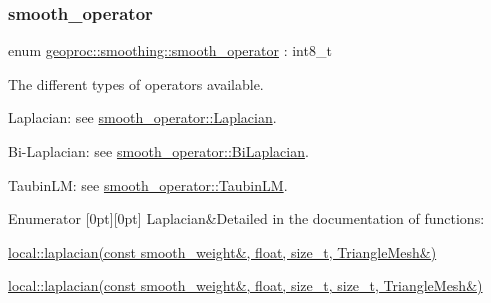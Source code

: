 \subsubsection{\texorpdfstring{smooth\+\_\+operator}{smooth\_operator}}
{\footnotesize\ttfamily enum \hyperlink{namespacegeoproc_1_1smoothing_a64c2bfd1dda6cfbf39afa2e61fd62537}{geoproc\+::smoothing\+::smooth\+\_\+operator} \+: int8\+\_\+t\hspace{0.3cm}{\ttfamily [strong]}}



The different types of operators available. 


\begin{DoxyItemize}
\item Laplacian\+: see \hyperlink{namespacegeoproc_1_1smoothing_a64c2bfd1dda6cfbf39afa2e61fd62537a799723f39baf497704a3d39e7c03555f}{smooth\+\_\+operator\+::\+Laplacian}.
\item Bi-\/\+Laplacian\+: see \hyperlink{namespacegeoproc_1_1smoothing_a64c2bfd1dda6cfbf39afa2e61fd62537a0890724bffb79f511bc768c0529dce3f}{smooth\+\_\+operator\+::\+Bi\+Laplacian}.
\item Taubin\+LM\+: see \hyperlink{namespacegeoproc_1_1smoothing_a64c2bfd1dda6cfbf39afa2e61fd62537ad69ec4945f39affa518f05fa077b00ae}{smooth\+\_\+operator\+::\+Taubin\+LM}. 
\end{DoxyItemize}\begin{DoxyEnumFields}{Enumerator}
[0pt][0pt]{}\mbox{\label{namespacegeoproc_1_1smoothing_a64c2bfd1dda6cfbf39afa2e61fd62537a799723f39baf497704a3d39e7c03555f}} 
Laplacian&Detailed in the documentation of functions\+:
\begin{DoxyItemize}
\item \hyperlink{namespacegeoproc_1_1smoothing_1_1local_a3eaa81a7fe893e316190a0ab9598732c}{local\+::laplacian(const smooth\+\_\+weight\&, float, size\+\_\+t, Triangle\+Mesh\&)}
\item \hyperlink{namespacegeoproc_1_1smoothing_1_1local_a160f3ee32c5073d99e3f38782bd4a070}{local\+::laplacian(const smooth\+\_\+weight\&, float, size\+\_\+t, size\+\_\+t, Triangle\+Mesh\&)} 
\end{DoxyItemize}\\
\hline


\end{DoxyEnumFields}
